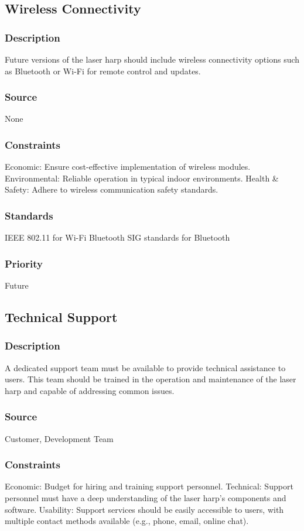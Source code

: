 \subsection{Wireless Connectivity}
\subsubsection{Description}
Future versions of the laser harp should include wireless connectivity options such as Bluetooth or Wi-Fi for remote control and updates.
\subsubsection{Source}
None
\subsubsection{Constraints}
Economic: Ensure cost-effective implementation of wireless modules.
Environmental: Reliable operation in typical indoor environments.
Health & Safety: Adhere to wireless communication safety standards.
\subsubsection{Standards}
IEEE 802.11 for Wi-Fi
Bluetooth SIG standards for Bluetooth
\subsubsection{Priority}
Future


\subsection{Technical Support}
\subsubsection{Description}
A dedicated support team must be available to provide technical assistance to users. This team should be trained in the operation and maintenance of the laser harp and capable of addressing common issues.
\subsubsection{Source}
Customer, Development Team
\subsubsection{Constraints}Economic: Budget for hiring and training support personnel.
Technical: Support personnel must have a deep understanding of the laser harp's components and software.
Usability: Support services should be easily accessible to users, with multiple contact methods available (e.g., phone, email, online chat).
